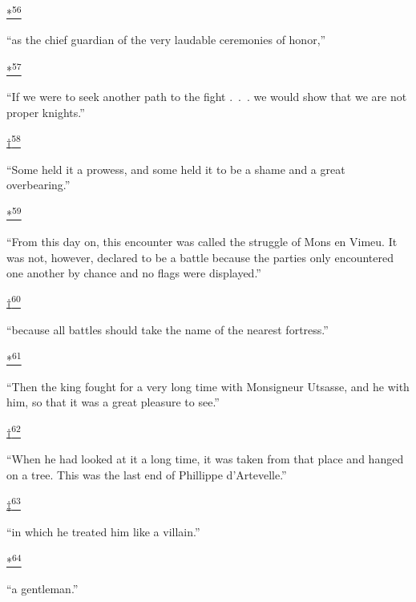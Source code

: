 \protect\hypertarget{23_NOTES.xhtmlux5cux23id_2900}{\protect\hyperlink{10_Chapter_Three__THE_HEROIC_DREAM.xhtmlux5cux23id_2899}{*\textsuperscript{56}}}
``as the chief guardian of the very laudable ceremonies of honor,''

\protect\hypertarget{23_NOTES.xhtmlux5cux23id_2902}{\protect\hyperlink{10_Chapter_Three__THE_HEROIC_DREAM.xhtmlux5cux23id_2901}{*\textsuperscript{57}}}
``If we were to seek another path to the fight .~.~. we would show that
we are not proper knights.''

\protect\hypertarget{23_NOTES.xhtmlux5cux23id_2904}{\protect\hyperlink{10_Chapter_Three__THE_HEROIC_DREAM.xhtmlux5cux23id_2903}{†\textsuperscript{58}}}
``Some held it a prowess, and some held it to be a shame and a great
overbearing.''

\protect\hypertarget{23_NOTES.xhtmlux5cux23id_2906}{\protect\hyperlink{10_Chapter_Three__THE_HEROIC_DREAM.xhtmlux5cux23id_2905}{*\textsuperscript{59}}}
``From this day on, this encounter was called the struggle of Mons en
Vimeu. It was not, however, declared to be a battle because the parties
only encountered one another by chance and no flags were displayed.''

\protect\hypertarget{23_NOTES.xhtmlux5cux23id_2908}{\protect\hyperlink{10_Chapter_Three__THE_HEROIC_DREAM.xhtmlux5cux23id_2907}{†\textsuperscript{60}}}
``because all battles should take the name of the nearest fortress.''

\protect\hypertarget{23_NOTES.xhtmlux5cux23id_2910}{\protect\hyperlink{10_Chapter_Three__THE_HEROIC_DREAM.xhtmlux5cux23id_2909}{*\textsuperscript{61}}}
``Then the king fought for a very long time with Monsigneur Utsasse, and
he with him, so that it was a great pleasure to see.''

\protect\hypertarget{23_NOTES.xhtmlux5cux23id_2912}{\protect\hyperlink{10_Chapter_Three__THE_HEROIC_DREAM.xhtmlux5cux23id_2911}{†\textsuperscript{62}}}
``When he had looked at it a long time, it was taken from that place and
hanged on a tree. This was the last end of Phillippe d'Artevelle.''

\protect\hypertarget{23_NOTES.xhtmlux5cux23id_2914}{\protect\hyperlink{10_Chapter_Three__THE_HEROIC_DREAM.xhtmlux5cux23id_2913}{‡\textsuperscript{63}}}
``in which he treated him like a villain.''

\protect\hypertarget{23_NOTES.xhtmlux5cux23id_2916}{\protect\hyperlink{10_Chapter_Three__THE_HEROIC_DREAM.xhtmlux5cux23id_2915}{*\textsuperscript{64}}}
``a gentleman.''

